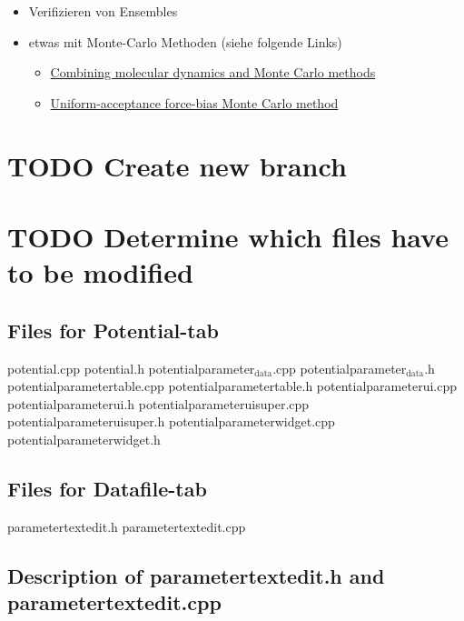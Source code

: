 \documentclass[11pt]{article}
\begin{document}
\begin{itemize}
\begin{enumerate}
\begin{itemize}
\item Verifizieren von Ensembles
\item etwas mit Monte-Carlo Methoden (siehe folgende Links)
\begin{itemize}
\item \href{file:///home/huber/Work/literature/Possible Master topics/Combining molecular dynamics with Monte Carlo simulations.pdf}{Combining molecular dynamics and Monte Carlo methods}
\item \href{file:///home/huber/Work/literature/Possible Master topics/Uniform-acceptance force-bias Monte Carlo method with time scale to study solid-state diffusion.pdf}{Uniform-acceptance force-bias Monte Carlo method}
\end{itemize}
\end{itemize}
\end{enumerate}
\end{itemize}

\section{\textbf{TODO} Create new branch}
\label{sec-1}

  
\section{\textbf{TODO} Determine which files have to be modified}
\label{sec-2}
\subsection{Files for Potential-tab}
\label{sec-2-1}

potential.cpp                
potential.h                  
potentialparameter$_{\mathrm{data}}$.cpp  
potentialparameter$_{\mathrm{data}}$.h    
potentialparametertable.cpp  
potentialparametertable.h
potentialparameterui.cpp
potentialparameterui.h
potentialparameteruisuper.cpp
potentialparameteruisuper.h
potentialparameterwidget.cpp
potentialparameterwidget.h
\subsection{Files for Datafile-tab}
\label{sec-2-2}

parametertextedit.h
parametertextedit.cpp
\subsection{Description of parametertextedit.h and parametertextedit.cpp}
\label{sec-2-3}
\end{document}
